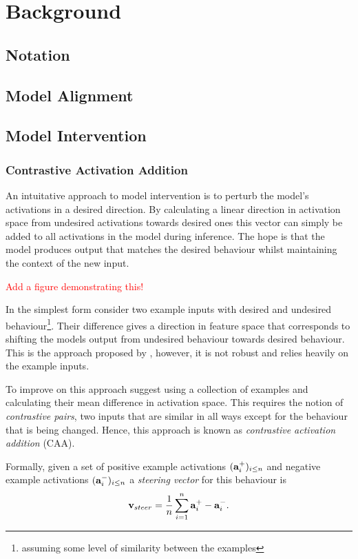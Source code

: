 \chapter{Background}

\section{Notation}

\section{Model Alignment}

\section{Model Intervention}

\subsection{Contrastive Activation Addition}

An intuitative approach to model intervention is to perturb the model's activations in a desired direction.
By calculating a linear direction in activation space from undesired activations towards desired ones this vector can simply be added to all activations in the model during inference.
The hope is that the model produces output that matches the desired behaviour whilst maintaining the context of the new input.

\textcolor{red}{Add a figure demonstrating this!}

In the simplest form consider two example inputs with desired and undesired behaviour\footnote{assuming some level of similarity between the examples}.
Their difference gives a direction in feature space that corresponds to shifting the models output from undesired behaviour towards desired behaviour.
This is the approach proposed by \citet{activation-addition}, however, it is not robust and relies heavily on the example inputs.

To improve on this approach \citet{caa} suggest using a collection of examples and calculating their mean difference in activation space.
This requires the notion of \textit{contrastive pairs}, two inputs that are similar in all ways except for the behaviour that is being changed.
Hence, this approach is known as \textit{contrastive activation addition} (CAA).

Formally, given a set of positive example activations $(\mathbf{a}_i^+)_{i\le n}$ and negative example activations $(\mathbf{a}_i^-)_{i\le n}$ a \textit{steering vector} for this behaviour is
\[\mathbf{v}_{steer} = \frac{1}{n}\sum_{i=1}^{n}\mathbf{a}_i^+ - \mathbf{a}_i^-.\]

